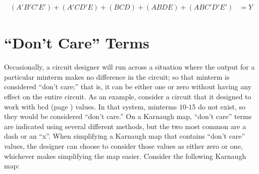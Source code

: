\begin{align}
  \label{KM:eq:k-map_five_variables_ex_2_simplified}
  (A'B'C'E')+(A'CD'E)+(BCD)+(ABDE)+(ABC'D'E') &= Y
\end{align}

\section{``Don't Care'' Terms}
\label{KM:sec:dont_care_terms}

Occasionally, a circuit designer will run across a situation where the output for a particular minterm makes no difference in the circuit; so that minterm is considered ``don't care;'' that is, it can be either one or zero without having any effect on the entire circuit. As an example, consider a circuit that it designed to work with \gls{bcd} (page \pageref{MO:subsub:binary_coded_decimal}) values. In that system, minterms $ 10 $-$ 15 $ do not exist, so they would be considered ``don't care.'' On a Karnaugh map, ``don't care'' terms are indicated using several different methods, but the two most common are a dash or an ``x''.  When simplifying a Karnaugh map that contains ``don't care'' values, the designer can choose to consider those values as either zero or one, whichever makes simplifying the map easier. Consider the following Karnaugh map:

